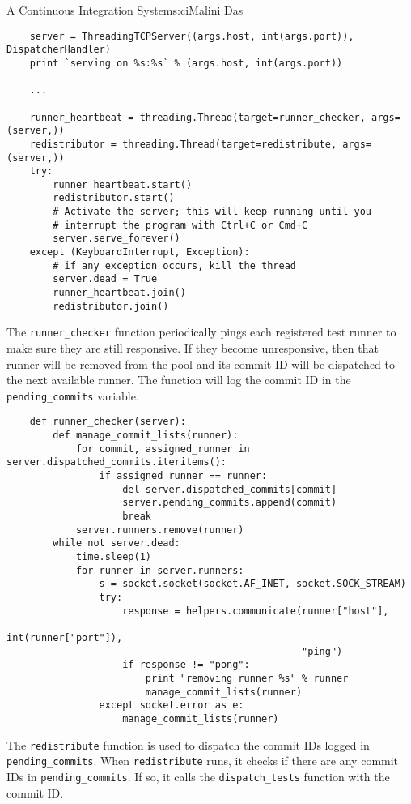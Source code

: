 \begin{aosachapter}{A Continuous Integration System}{s:ci}{Malini Das}
\begin{verbatim}
    server = ThreadingTCPServer((args.host, int(args.port)), DispatcherHandler)
    print `serving on %s:%s` % (args.host, int(args.port))

    ...

    runner_heartbeat = threading.Thread(target=runner_checker, args=(server,))
    redistributor = threading.Thread(target=redistribute, args=(server,))
    try:
        runner_heartbeat.start()
        redistributor.start()
        # Activate the server; this will keep running until you
        # interrupt the program with Ctrl+C or Cmd+C
        server.serve_forever()
    except (KeyboardInterrupt, Exception):
        # if any exception occurs, kill the thread
        server.dead = True
        runner_heartbeat.join()
        redistributor.join()
\end{verbatim}

The \texttt{runner\_checker} function periodically pings each registered
test runner to make sure they are still responsive. If they become
unresponsive, then that runner will be removed from the pool and its
commit ID will be dispatched to the next available runner. The function
will log the commit ID in the \texttt{pending\_commits} variable.

\begin{verbatim}
    def runner_checker(server):
        def manage_commit_lists(runner):
            for commit, assigned_runner in server.dispatched_commits.iteritems():
                if assigned_runner == runner:
                    del server.dispatched_commits[commit]
                    server.pending_commits.append(commit)
                    break
            server.runners.remove(runner)
        while not server.dead:
            time.sleep(1)
            for runner in server.runners:
                s = socket.socket(socket.AF_INET, socket.SOCK_STREAM)
                try:
                    response = helpers.communicate(runner["host"],
                                                   int(runner["port"]),
                                                   "ping")
                    if response != "pong":
                        print "removing runner %s" % runner
                        manage_commit_lists(runner)
                except socket.error as e:
                    manage_commit_lists(runner)
\end{verbatim}

The \texttt{redistribute} function is used to dispatch the commit IDs
logged in \texttt{pending\_commits}. When \texttt{redistribute} runs, it
checks if there are any commit IDs in \texttt{pending\_commits}. If so,
it calls the \texttt{dispatch\_tests} function with the commit ID.


\end{aosachapter}
